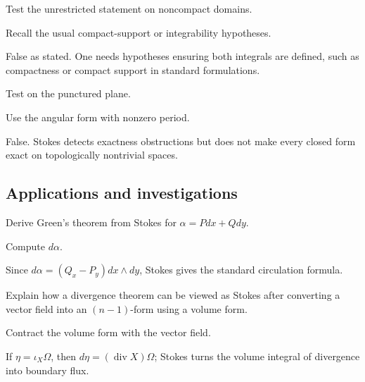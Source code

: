 \begin{exercise}\label{exr:vii11-ped-11}
Test the unrestricted statement on noncompact domains.
\end{exercise}
\begin{hint}
Recall the usual compact-support or integrability hypotheses.
\end{hint}
\begin{solution}
False as stated.  One needs hypotheses ensuring both integrals are defined, such as compactness or compact support in standard formulations.
\end{solution}

\begin{exercise}\label{exr:vii11-ped-12}
Test on the punctured plane.
\end{exercise}
\begin{hint}
Use the angular form with nonzero period.
\end{hint}
\begin{solution}
False.  Stokes detects exactness obstructions but does not make every closed form exact on topologically nontrivial spaces.
\end{solution}

\subsection*{Applications and investigations}

\begin{exercise}\label{exr:vii11-ped-13}
Derive Green's theorem from Stokes for \(\alpha=Pdx+Qdy\).
\end{exercise}
\begin{hint}
Compute \(d\alpha\).
\end{hint}
\begin{solution}
Since \(d\alpha=(Q_x-P_y)dx\wedge dy\), Stokes gives the standard circulation formula.
\end{solution}

\begin{exercise}\label{exr:vii11-ped-14}
Explain how a divergence theorem can be viewed as Stokes after converting a vector field into an \((n-1)\)-form using a volume form.
\end{exercise}
\begin{hint}
Contract the volume form with the vector field.
\end{hint}
\begin{solution}
If \(\eta=\iota_X\Omega\), then \(d\eta=(\operatorname{div}X)\Omega\); Stokes turns the volume integral of divergence into boundary flux.
\end{solution}

